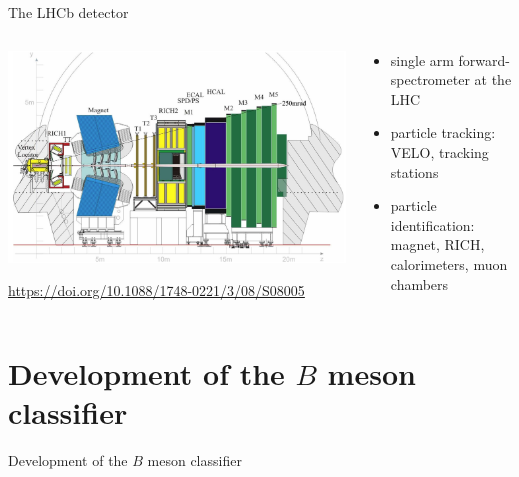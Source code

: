 \documentclass[aspectratio=1610, 10pt]{beamer}
\begin{document}
\begin{frame}{The LHCb detector}
  \begin{columns}
    \begin{column}{0.6\textwidth}
      \centering
      \includegraphics[width=\textwidth]{images/lhcb_detector.png}

      \tiny \url{https://doi.org/10.1088/1748-0221/3/08/S08005}
    \end{column}
    \begin{column}{0.4\textwidth}
      \begin{itemize}
        \item single arm forward-spectrometer at the LHC %
        \item particle tracking: VELO, tracking stations
        \item particle identification: magnet, RICH, calorimeters, muon chambers
      \end{itemize}
    \end{column}
  \end{columns}
\end{frame}

\section*{Development of the $B$ meson classifier}

\begin{frame}{Development of the $B$ meson classifier}

\end{frame}
\end{document}
